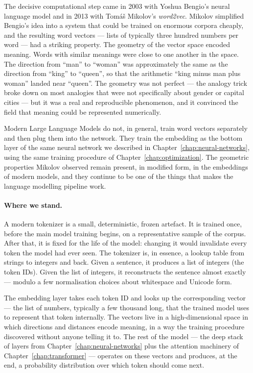 The decisive computational step came in 2003 with Yoshua
Bengio's neural language model and in 2013 with Tom\'a\v{s}
Mikolov's \emph{word2vec}. Mikolov simplified Bengio's idea
into a system that could be trained on enormous corpora cheaply,
and the resulting word vectors --- lists of typically three
hundred numbers per word --- had a striking property. The
geometry of the vector space encoded meaning. Words with
similar meanings were close to one another in the space. The
direction from ``man'' to ``woman'' was approximately the same
as the direction from ``king'' to ``queen'', so that the
arithmetic ``king minus man plus woman'' landed near
``queen''. The geometry was not perfect --- the analogy trick
broke down on most analogies that were not specifically about
gender or capital cities --- but it was a real and reproducible
phenomenon, and it convinced the field that meaning could be
represented numerically.

Modern Large Language Models do not, in general, train word
vectors separately and then plug them into the network. They
train the embedding as the bottom layer of the same neural
network we described in Chapter~\ref{chap:neural-networks}, using the same training
procedure of Chapter~\ref{chap:optimization}. The geometric properties Mikolov
observed remain present, in modified form, in the embeddings of
modern models, and they continue to be one of the things that
makes the language modelling pipeline work.

\paragraph{Where we stand.} A modern tokenizer is a small, deterministic, frozen artefact.
It is trained once, before the main model training begins, on a
representative sample of the corpus. After that, it is fixed for
the life of the model: changing it would invalidate every token
the model had ever seen. The tokenizer is, in essence, a lookup
table from strings to integers and back. Given a sentence, it
produces a list of integers (the token IDs). Given the list of
integers, it reconstructs the sentence almost exactly --- modulo
a few normalisation choices about whitespace and Unicode form.

The embedding layer takes each token ID and looks up the
corresponding vector --- the list of numbers, typically a few
thousand long, that the trained model uses to represent that
token internally. The vectors live in a high-dimensional space
in which directions and distances encode meaning, in a way the
training procedure discovered without anyone telling it to. The
rest of the model --- the deep stack of layers from Chapter~\ref{chap:neural-networks}
plus the attention machinery of Chapter~\ref{chap:transformer} --- operates on these
vectors and produces, at the end, a probability distribution
over which token should come next.

